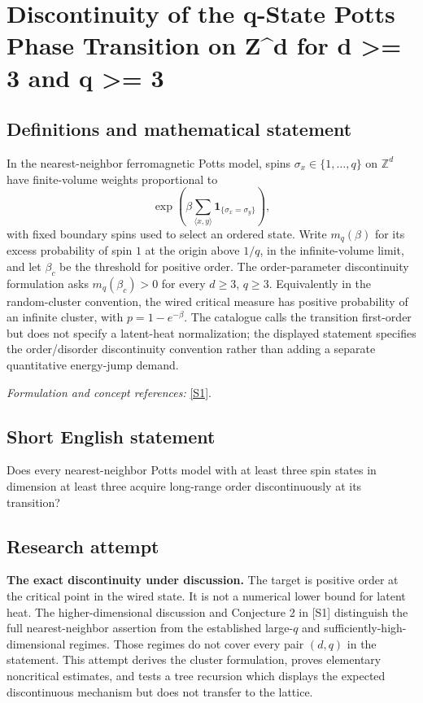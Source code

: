 \documentclass[11pt]{article}
\begin{document}
\section*{\texorpdfstring{Discontinuity of the q-State Potts Phase Transition on Z\textasciicircum{}d for d >= 3 and q >= 3}{Discontinuity of the q-State Potts Phase Transition on Z\textasciicircum{}d for d >= 3 and q >= 3}}\label{statement}
\subsection{Definitions and mathematical statement}
In the nearest-neighbor ferromagnetic Potts model, spins $\sigma_x\in\{1,\ldots,q\}$ on ${\mathbb{Z}}^d$ have finite-volume weights proportional to
\[
 \exp\!\left(\beta\sum_{\langle x,y\rangle}
 \mathbf1_{\{\sigma_x=\sigma_y\}}\right),
\]
with fixed boundary spins used to select an ordered state. Write $m_q(\beta)$ for its excess probability of spin $1$ at the origin above $1/q$, in the infinite-volume limit, and let $\beta_c$ be the threshold for positive order. The order-parameter discontinuity formulation asks $m_q(\beta_c)>0$ for every $d\ge3$, $q\ge3$. Equivalently in the random-cluster convention, the wired critical measure has positive probability of an infinite cluster, with $p=1-e^{-\beta}$. The catalogue calls the transition first-order but does not specify a latent-heat normalization; the displayed statement specifies the order/disorder discontinuity convention rather than adding a separate quantitative energy-jump demand.
\par\smallskip\textit{Formulation and concept references:} \href{https://ar5iv.labs.arxiv.org/html/1707.00520}{[S1]}.

\subsection{Short English statement}
Does every nearest-neighbor Potts model with at least three spin states in dimension at least three acquire long-range order discontinuously at its transition?
\subsection{Research attempt}
\textbf{The exact discontinuity under discussion.}
The target is positive order at the critical point in the wired state.  It is
not a numerical lower bound for latent heat.  The higher-dimensional discussion
and Conjecture 2 in [S1] distinguish the full nearest-neighbor assertion from
the established large-$q$ and sufficiently-high-dimensional regimes.  Those
regimes do not cover every pair $(d,q)$ in the statement.  This attempt derives
the cluster formulation, proves elementary noncritical estimates, and tests a
tree recursion which displays the expected discontinuous mechanism but does
not transfer to the lattice.
\end{document}
